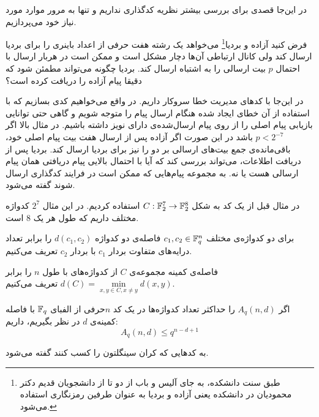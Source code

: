 در این‌جا قصدی برای بررسی بیشتر نظریه کدگذاری نداریم و تنها به مرور موارد مورد نیاز خود می‌پردازیم.
\begin{example}
	فرض کنید آزاده و بردیا\footnote{طبق سنت دانشکده، به جای آلیس و باب از دو تا از دانشجویان قدیم دکتر محمودیان در دانشکده یعنی آزاده و بردیا به عنوان طرفین رمزنگاری استفاده می‌شود.}
	 می‌خواهد یک رشته هفت حرفی از اعداد باینری را برای بردیا ارسال کند ولی کانال ارتباطی آن‌ها دچار مشکل است و ممکن است در هربار ارسال با احتمال
	$p$
	بیت ارسالی را به اشتباه ارسال کند. بردیا چگونه می‌تواند مطمئن شود که دقیقا پیام آزاده را دریافت کرده است؟
	
	در این‌جا با کدهای مدیریت خطا سروکار داریم. در واقع می‌خواهیم کدی بسازیم که با استفاده از آن خطای ایجاد شده هنگام ارسال پیام را متوجه شویم و گاهی حتی توانایی بازیابی پیام اصلی را از روی پیام ارسال‌شده‌ی دارای نویز داشته باشیم. در مثال بالا اگر
	$p < 2^{-7}$
	باشد در این صورت اگر آزاده پس از ارسال هفت بیت پیام اصلی خود، باقی‌مانده‌ی جمع بیت‌های ارسالی بر دو را نیز برای بردیا ارسال کند. بردیا پس از دریافت اطلاعات، می‌تواند بررسی کند که آیا با احتمال بالایی پیام دریافتی همان پیام ارسالی هست یا نه. به مجموعه‌ پیام‌هایی که ممکن است در فرایند کدگذاری ارسال شوند 
	گفته می‌شود.
	
	در مثال قبل از یک کد به شکل
	$C: \mathbb{F}_2^7 \rightarrow \mathbb{F}_2^8$
	استفاده کردیم. در این مثال
	$2^7$
	کدواژه مختلف داریم که طول هر یک
	$8$
	است.
\end{example}

\begin{definition}
	برای دو کدواژه‌ی مختلف
	$c_1, c_2 \in \mathbb{F}_q^n$
	فاصله‌ی دو کدواژه
	$d(c_1, c_2)$
	را برابر تعداد درایه‌های متفاوت بردار
	$c_1$
	با بردار
	$c_2$
	تعریف می‌کنیم.
	
	 فاصله‌‌ی کمینه مجموعه‌ی
	$C$
	از کدواژه‌های با طول
	$n$
	 را برابر
	$d(C) = \min\limits_{x, y \in C, x \ne y} d(x, y)$
	تعریف می‌کنیم.
\end{definition}

\begin{definition}
	اگر
	$A_q(n, d)$
	را حداکثر تعداد کدواژه‌ها در یک کد
	$n$حرفی
 از الفبای
	$\mathbb{F}_q$
	با فاصله کمینه‌ی 
	$d$
	در نظر بگیریم، داریم:
	\begin{equation}
		A_q(n, d) \leq q^{n - d + 1}
	\end{equation}
\end{definition}
\begin{definition}
	\label{def:mds}
	به کدهایی که کران سینگلتون را کسب کنند گفته می‌شود.
\end{definition}

